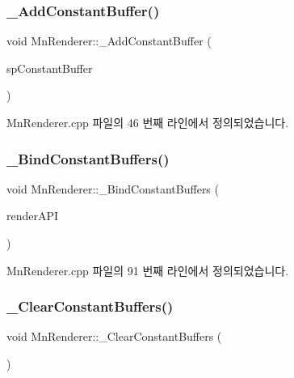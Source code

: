 \subsubsection{\texorpdfstring{\+\_\+\+Add\+Constant\+Buffer()}{\_AddConstantBuffer()}}
{\footnotesize\ttfamily void Mn\+Renderer\+::\+\_\+\+Add\+Constant\+Buffer (\begin{DoxyParamCaption}\item[{const std\+::shared\+\_\+ptr$<$ \hyperlink{class_m_n_l_1_1_mn_constant_buffer}{Mn\+Constant\+Buffer} $>$}]{sp\+Constant\+Buffer }\end{DoxyParamCaption})\hspace{0.3cm}{\ttfamily [protected]}}



Mn\+Renderer.\+cpp 파일의 46 번째 라인에서 정의되었습니다.

\mbox{\label{class_m_n_l_1_1_mn_renderer_a4e99adeded808fdde2e0b79d2719c03e}} 
\subsubsection{\texorpdfstring{\+\_\+\+Bind\+Constant\+Buffers()}{\_BindConstantBuffers()}}
{\footnotesize\ttfamily void Mn\+Renderer\+::\+\_\+\+Bind\+Constant\+Buffers (\begin{DoxyParamCaption}\item[{\hyperlink{class_m_n_l_1_1_mn_render_a_p_i}{Mn\+Render\+A\+PI} \&}]{render\+A\+PI }\end{DoxyParamCaption})\hspace{0.3cm}{\ttfamily [protected]}}



Mn\+Renderer.\+cpp 파일의 91 번째 라인에서 정의되었습니다.

\mbox{\label{class_m_n_l_1_1_mn_renderer_a5306058d3813bdf14af2a42b0df96eef}} 
\subsubsection{\texorpdfstring{\+\_\+\+Clear\+Constant\+Buffers()}{\_ClearConstantBuffers()}}
{\footnotesize\ttfamily void Mn\+Renderer\+::\+\_\+\+Clear\+Constant\+Buffers (\begin{DoxyParamCaption}{ }\end{DoxyParamCaption})\hspace{0.3cm}{\ttfamily [protected]}}



